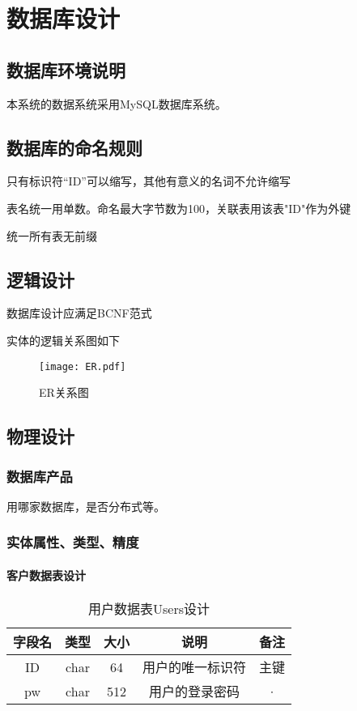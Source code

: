 \chapter{数据库设计}
\section{数据库环境说明}
本系统的数据系统采用MySQL数据库系统。

\section{数据库的命名规则}
只有标识符“ID”可以缩写，其他有意义的名词不允许缩写

表名统一用单数。命名最大字节数为100，关联表用该表"ID"作为外键

统一所有表无前缀

\section{逻辑设计}
数据库设计应满足BCNF范式

实体的逻辑关系图如下
\begin{figure}
    \centering
    \texttt{[image: ER.pdf]}
    \caption{ER关系图}\label{fig:noted-figure}
\end{figure}

\section{物理设计}
\subsection{数据库产品}
用哪家数据库，是否分布式等。
\subsection{实体属性、类型、精度}
\subsubsection{客户数据表设计}
\begin{table}[htbp]
\centering
\caption{用户数据表Users设计} \label{tab:client-database}
\begin{tabular}{|c|c|c|c|c|}
    \hline
    字段名 & 类型 & 大小 & 说明 & 备注 \\
    \hline
    ID & char & 64 & 用户的唯一标识符 & 主键\\
    \hline
    pw & char & 512 & 用户的登录密码 & · \\
    \hline
\end{tabular}
\end{table}

